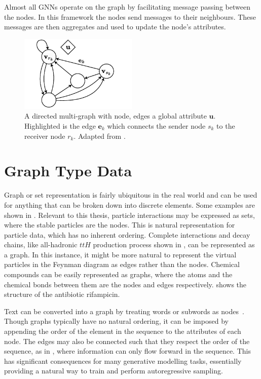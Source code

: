 Almost all GNNs operate on the graph by facilitating message passing between the nodes.
In this framework the nodes send messages to their neighbours.
These messages are then aggregates and used to update the node's attributes.

\begin{figure}
    \centering
    \includegraphics[width=0.5\textwidth]{Figures/transformers/graphs.pdf}
    \caption{A directed multi-graph with node, edges a global attribute $\mathbf{u}$. Highlighted is the edge $\mathbf{e}_{k}$ which connects the sender node $s_k$ to the receiver node $r_k$. Adapted from \textcite{RelationalInductiveBiases}.}
    \label{fig:graph}
\end{figure}

\section{Graph Type Data}

Graph or set representation is fairly ubiquitous in the real world and can be used for anything that can be broken down into discrete elements.
Some examples are shown in .
Relevant to this thesis, particle interactions may be expressed as sets, where the stable particles are the nodes.
This is natural representation for particle data, which has no inherent ordering.
Complete interactions and decay chains, like all-hadronic $ttH$ production process shown in , can be represented as a graph.
In this instance, it might be more natural to represent the virtual particles in the Feynman diagram as edges rather than the nodes.
Chemical compounds can be easily represented as graphs, where the atoms and the chemical bonds between them are the nodes and edges respectively.
 shows the structure of the antibiotic rifampicin.

Text can be converted into a graph by treating words or subwords as nodes~.
Though graphs typically have no natural ordering, it can be imposed by appending the order of the element in the sequence to the attributes of each node.
The edges may also be connected such that they respect the order of the sequence, as in , where information can only flow forward in the sequence.
This has significant consequences for many generative modelling tasks, essentially providing a natural way to train and perform autoregressive sampling.

